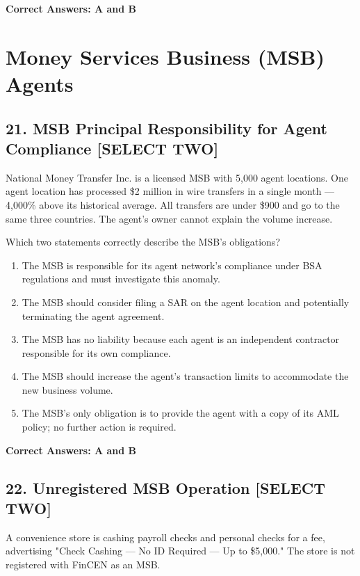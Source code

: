 \documentclass[11pt,a4paper]{article}
\begin{document}
	\textbf{Correct Answers: A and B}
	
	\section{Money Services Business (MSB) Agents}
	
	\subsection{21. MSB Principal Responsibility for Agent Compliance \textnormal{[SELECT TWO]}}
	
	National Money Transfer Inc. is a licensed MSB with 5,000 agent locations. One agent location has processed \$2 million in wire transfers in a single month — 4,000\% above its historical average. All transfers are under \$900 and go to the same three countries. The agent's owner cannot explain the volume increase.
	
	Which two statements correctly describe the MSB's obligations?
	
	\begin{enumerate}[label=\Alph*.]
		\item The MSB is responsible for its agent network's compliance under BSA regulations and must investigate this anomaly.
		\item The MSB should consider filing a SAR on the agent location and potentially terminating the agent agreement.
		\item The MSB has no liability because each agent is an independent contractor responsible for its own compliance.
		\item The MSB should increase the agent's transaction limits to accommodate the new business volume.
		\item The MSB's only obligation is to provide the agent with a copy of its AML policy; no further action is required.
	\end{enumerate}
	
	\textbf{Correct Answers: A and B}
	
	\subsection{22. Unregistered MSB Operation \textnormal{[SELECT TWO]}}
	
	A convenience store is cashing payroll checks and personal checks for a fee, advertising "Check Cashing — No ID Required — Up to \$5,000." The store is not registered with FinCEN as an MSB.
	
\end{document}
